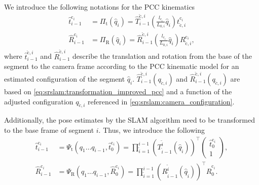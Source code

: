 We introduce the following notations for the \gls{PCC} kinematics
\begin{equation}\label{eq:srslam:Pi}
\begin{split}
    \hat{t}_{i-1}^{\mathrm{c}_i} &= \Pi_\mathrm{t}(\hat{q}_i) = 
    \hat{T}_{i-1}^{\check{\mathrm{c}},i} \left (\frac{l_{\mathrm{c}_i}}{L_{0,i}} \hat{q}_i \right )
    t_{\check{\mathrm{c}},i}^{\mathrm{c}_i}\\
    \hat{R}_{i-1}^{\mathrm{c}_i} &= \Pi_\mathrm{R}(\hat{q}_i) =
    \hat{R}_{i-1}^{\check{\mathrm{c}},i} \left (\frac{l_{\mathrm{c}_i}}{L_{0,i}} \hat{q}_i \right )
    R_{\check{\mathrm{c}},i}^{\mathrm{c}_i},
\end{split}
\end{equation}
where $\hat{t}_{i-1}^{\check{\mathrm{c}},i}$ and $\hat{R}_{i-1}^{\check{\mathrm{c}},i}$ describe the translation and rotation from the base of the segment to the camera frame according to the \gls{PCC} kinematic model for an estimated configuration of the segment $\hat{q}_i$. $\hat{T}_{i-1}^{\check{\mathrm{c}},i}(q_{\check{c},i})$ and $\hat{R}_{i-1}^{\check{\mathrm{c}},i}(q_{\check{c},i})$ are based on \eqref{eq:srslam:transformation_improved_pcc} and a function of the adjusted configuration $q_{\check{c},i}$ referenced in \eqref{eq:srslam:camera_configuration}.

Additionally, the pose estimates by the \gls{SLAM} algorithm need to be transformed to the base frame of segment $i$. Thus, we introduce the following
\begin{equation}\label{eq:srslam:Psi}
\begin{split}
    \hat{t}_{i-1}^{\mathrm{c}_i} &= \Psi_\mathrm{t}(q_1 \dots q_{i-1}, \hat{t}_{0}^{\mathrm{c}_i}) =
    \prod_{\tilde{i}=1}^{i-1} \left ( T_{\tilde{i}-1}^{\tilde{i}} \left (\hat{q}_{\tilde{i}} \right )  \right )^\top
    \begin{pmatrix}
        \hat{t}_{0}^{\mathrm{c}_i}\\
        1
    \end{pmatrix},\\
    \hat{R}_{i-1}^{\mathrm{c}_i} &= \Psi_\mathrm{R}(q_1 \dots q_{i-1}, \hat{R}_{0}^{\mathrm{c}_i}) =
    \prod_{\tilde{i}=1}^{i-1} \left ( R_{\tilde{i}-1}^{\tilde{i}} \left (\hat{q}_{\tilde{i}} \right )  \right )^\top
    \hat{R}_{0}^{\mathrm{c}_i}.
\end{split}    
\end{equation}

